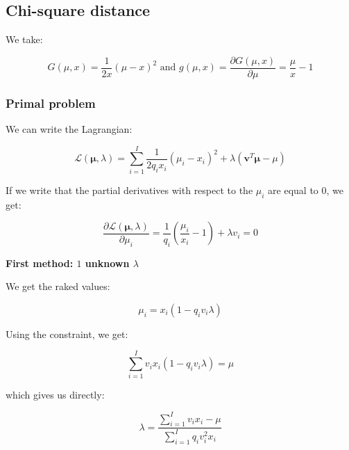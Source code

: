\documentclass{tex/note}
\begin{document}
\subsection{Chi-square distance}

We take:

\begin{equation*}
G \left( \mu , x \right) = \frac{1}{2 x} \left( \mu - x \right) ^2 \text{ and } g \left( \mu , x \right) = \frac{\partial G \left( \mu , x \right)}{\partial \mu} = \frac{\mu}{x} - 1
\end{equation*}

\subsubsection{Primal problem}

We can write the Lagrangian:

\begin{equation*}
\mathcal{L} \left( \bm{\mu} , \lambda \right) = \sum_{i = 1}^I \frac{1}{2 q_i x_i} \left( \mu_i - x_i \right) ^2 + \lambda \left( \bm{v}^T \bm{\mu} - \mu \right)
\end{equation*}

If we write that the partial derivatives with respect to the $\mu_i$ are equal to $0$, we get:

\begin{equation*}
\frac{\partial \mathcal{L} \left( \bm{\mu} , \lambda \right)}{\partial \mu_i} =  \frac{1}{q_i} \left( \frac{\mu_i}{x_i} - 1 \right) + \lambda v_i = 0
\end{equation*}

\textbf{First method: $1$ unknown $\lambda$}

We get the raked values:

\begin{equation*}
\mu_i = x_i \left( 1 - q_i v_i \lambda \right)
\end{equation*}

Using the constraint, we get:

\begin{equation*}
\sum_{i = 1}^I v_i x_i \left( 1 - q_i v_i \lambda \right) = \mu
\end{equation*}

which gives us directly:

\begin{equation*}
\lambda = \frac{\sum_{i = 1}^I v_i x_i - \mu}{\sum_{i = 1}^I q_i v_i^2 x_i}
\end{equation*}
\end{document}
